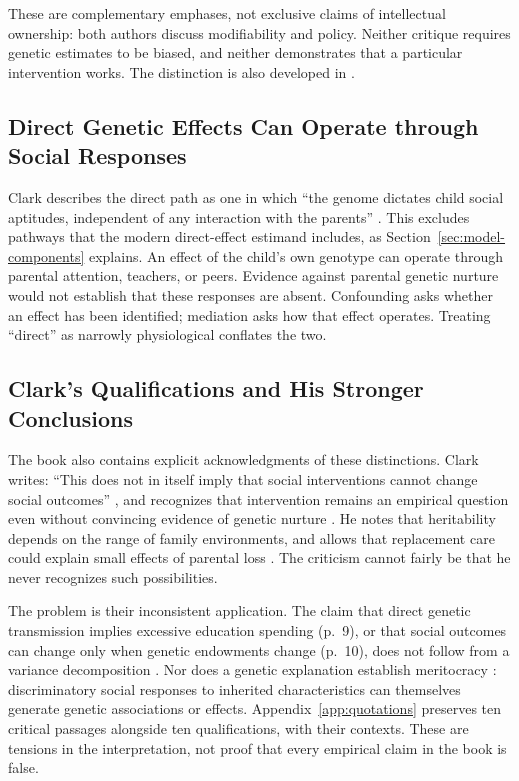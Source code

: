 These are complementary emphases, not exclusive claims of intellectual
ownership: both authors discuss modifiability and policy. Neither critique
requires genetic estimates to be biased, and neither demonstrates that a
particular intervention works. The distinction is also developed in
\citet[secs.~3.4 and 3.6]{BenjaminEtAl2026}.


\subsection{Direct Genetic Effects Can Operate through Social Responses}
Clark describes the direct path as one in which ``the genome dictates
child social aptitudes, independent of any interaction with the parents''
\citep[p.~286]{Clark2026}. This excludes pathways that the modern direct-effect
estimand includes, as Section~\ref{sec:model-components} explains. An effect
of the child's own genotype can operate through parental attention,
teachers, or peers. Evidence against parental genetic nurture would not
establish that these responses are absent. Confounding asks whether an
effect has been identified; mediation asks how that effect operates.
Treating ``direct'' as narrowly physiological conflates the two.

\subsection{Clark's Qualifications and His Stronger Conclusions}
The book also contains explicit acknowledgments of these distinctions.
Clark writes: ``This does not in itself imply that social interventions
cannot change social outcomes'' \citep[p.~80]{Clark2026}, and recognizes
that intervention remains an empirical question even without convincing
evidence of genetic nurture \citep[p.~86]{Clark2026}. He notes that
heritability depends on the range of family environments, and allows
that replacement care could explain small effects of parental loss \citep[pp.~14,191,288]{Clark2026}.
The criticism cannot fairly be that he never recognizes such possibilities.

The problem is their inconsistent application. The claim that direct
genetic transmission implies excessive education spending (p.~9), or
that social outcomes can change only when genetic endowments change
(p.~10), does not follow from a variance decomposition \citep[pp.~9--10]{Clark2026}. Nor does a
genetic explanation establish meritocracy \citep[p.~7]{Clark2026}: discriminatory social
responses to inherited characteristics can themselves generate genetic
associations or effects. Appendix~\ref{app:quotations} preserves ten
critical passages alongside ten qualifications, with their contexts.
These are tensions in the interpretation, not proof that every empirical
claim in the book is false.

